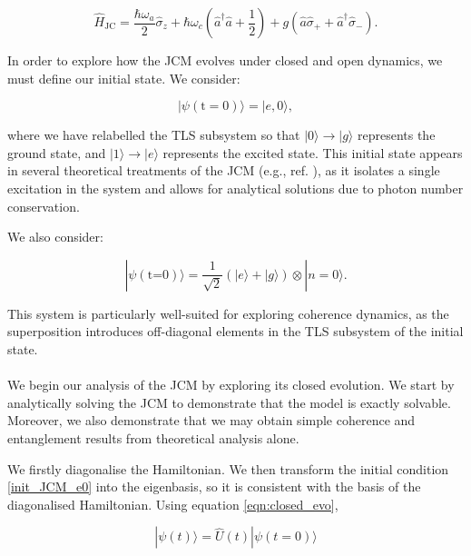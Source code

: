 \documentclass[11pt]{article}
\begin{document}
\begin{equation*}
    \hat{H}_{\scriptscriptstyle \text{JC}} = \frac{\hbar\omega_a}{2}\hat{\sigma}_z + \hbar\omega_c\left(\hat{a}^\dagger \hat{a} + \frac{1}{2} \right) + g(\hat{a}\hat{\sigma}_{+} + \hat{a}^\dagger\hat{\sigma}_{-}). 
\end{equation*} 

In order to explore how the JCM evolves under closed and open dynamics, we must define our initial state. We consider:

\begin{equation} \label{init_JCM_e0}
    |\psi (\text{t}=0)\rangle = |e, 0\rangle,
\end{equation}

where we have relabelled the TLS subsystem so that $|0\rangle \rightarrow|g\rangle$ represents the ground state, and $|1\rangle \rightarrow |e\rangle$ represents the excited state. This initial state appears in several theoretical treatments of the JCM (e.g., ref. \cite{Entanglement2009-REE_VNapplied}), as it isolates a single excitation in the system and allows for analytical solutions due to photon number conservation.

We also consider:

\begin{equation} \label{init_JCM_e0g0}
    |\psi (\text{t=0})\rangle = \frac{1}{\sqrt{2}}(|e\rangle + |g\rangle)\otimes|n=0\rangle.
\end{equation}

This system is particularly well-suited for exploring coherence dynamics, as the superposition introduces off-diagonal elements in the TLS subsystem of the initial state.\\
\\
We begin our analysis of the JCM by exploring its closed evolution. We start by analytically solving the JCM to demonstrate that the model is exactly solvable. Moreover, we also demonstrate that we may obtain simple coherence and entanglement results from theoretical analysis alone. 

We firstly diagonalise the Hamiltonian. We then transform the initial condition \eqref{init_JCM_e0} into the eigenbasis, so it is consistent with the basis of the diagonalised Hamiltonian. Using equation \eqref{eqn:closed_evo},

\begin{equation*} 
    |\psi(t)\rangle = \hat{U}(t)|\psi(t=0)\rangle
\end{equation*}
\end{document}
